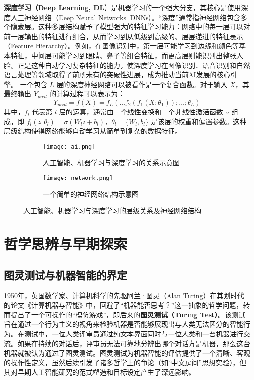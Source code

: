 \textbf{深度学习（Deep Learning, DL）}\cite{ahmed2023deep}是机器学习的一个强大分支，其核心是使用深度人工神经网络（Deep Neural Networks, DNNs）。“深度”通常指神经网络包含多个隐藏层。这种多层结构赋予了模型强大的特征学习能力：网络中的每一层可以对前一层输出的特征进行组合，从而学习到从低级到高级的、层层递进的特征表示（Feature Hierarchy）。例如，在图像识别中，第一层可能学习到边缘和颜色等基本特征，中间层可能学习到眼睛、鼻子等组合特征，而更高层则能识别出整张人脸。正是这种自动学习复杂特征的能力，使深度学习在图像识别、语音识别和自然语言处理等领域取得了前所未有的突破性进展，成为推动当前AI发展的核心引擎。
一个包含 $L$ 层的深度神经网络可以被看作是一个复合函数。对于输入 $X$，其最终输出 $Y_{pred}$ 的计算过程可以表示为：
$$ Y_{pred} = f(X) = f_L(\dots f_2(f_1(X; \theta_1)); \dots; \theta_L) $$
其中，$f_l$ 代表第 $l$ 层的运算，通常由一个线性变换和一个非线性激活函数 $\sigma$ 组成，即 $f_l(z; \theta_l) = \sigma(W_l z + b_l)$，$\theta_l = \{W_l, b_l\}$ 是该层的权重和偏置参数。这种层级结构使得网络能够自动学习从简单到复杂的数据特征。


\begin{figure}[H]
    \centering
    \begin{subfigure}[b]{0.45\textwidth} %
        \centering
        \texttt{[image: ai.png]}
        \caption{人工智能、机器学习与深度学习的关系示意图}
        \label{fig:grouped_a}
    \end{subfigure}
    \hspace{1cm} 
    \begin{subfigure}[b]{0.45\textwidth}
        \centering
        \texttt{[image: network.png]}
        \caption{一个简单的神经网络结构示意图}
        \label{fig:grouped_b}
    \end{subfigure}
    \caption{人工智能、机器学习与深度学习的层级关系及神经网络结构}
    \label{fig:grouped_total}
\end{figure}

\section{哲学思辨与早期探索}
\label{sec:early_exploration}

\subsection{图灵测试与机器智能的界定}
\label{ssec:turing_test}
1950年，英国数学家、计算机科学的先驱阿兰·图灵（Alan Turing）在其划时代的论文《计算机器与智能》中，回避了“机器能否思考？”这一抽象的哲学问题，转而提出了一个可操作的“模仿游戏”，即后来的\textbf{图灵测试（Turing Test）}。该测试旨在通过一个行为主义的视角来检验机器是否能够展现出与人类无法区分的智能行为。在测试中，一位人类评审员通过纯文本界面同时与一位人类和一台机器进行交流。如果在持续的对话后，评审员无法可靠地分辨出哪个对话方是机器，那么这台机器就被认为通过了图灵测试。图灵测试为机器智能的评估提供了一个清晰、客观的操作性定义，虽然后续引发了诸多哲学上的争论（如“中文房间”思想实验），但其对早期人工智能研究的范式塑造和目标设定产生了深远影响。

